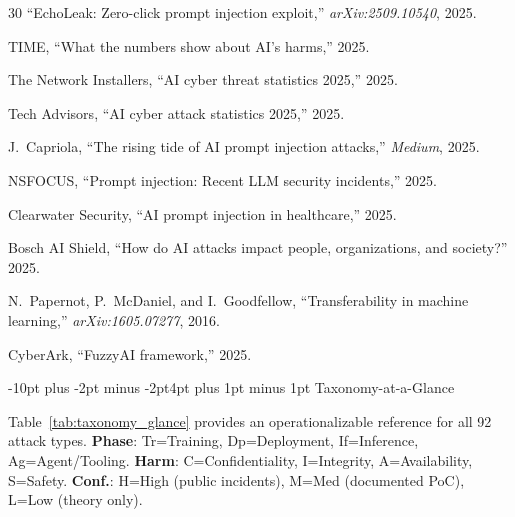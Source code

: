 \documentclass[conference]{IEEEtran}
\makeatletter
\renewcommand{\section}{\@startsection{section}{1}{\z@}%
  {-10pt plus -2pt minus -2pt}{4pt plus 1pt minus 1pt}%
  {\normalfont\large\bfseries\sffamily\color{accentdark}}}
\makeatother
\begin{document}
\begin{thebibliography}{30}
``EchoLeak: Zero-click prompt injection exploit,'' \emph{arXiv:2509.10540}, 2025.

TIME, ``What the numbers show about AI's harms,'' 2025.

The Network Installers, ``AI cyber threat statistics 2025,'' 2025.

Tech Advisors, ``AI cyber attack statistics 2025,'' 2025.

J.~Capriola, ``The rising tide of AI prompt injection attacks,'' \emph{Medium}, 2025.

NSFOCUS, ``Prompt injection: Recent LLM security incidents,'' 2025.

Clearwater Security, ``AI prompt injection in healthcare,'' 2025.

Bosch AI Shield, ``How do AI attacks impact people, organizations, and society?'' 2025.

N.~Papernot, P.~McDaniel, and I.~Goodfellow, ``Transferability in machine learning,'' \emph{arXiv:1605.07277}, 2016.

CyberArk, ``FuzzyAI framework,'' 2025.

\end{thebibliography}


\appendix


\onecolumn
\section{Taxonomy-at-a-Glance}\label{app:taxonomy}

Table~\ref{tab:taxonomy_glance} provides an operationalizable reference for all 92 attack types. \textbf{Phase}: Tr=Training, Dp=Deployment, If=Inference, Ag=Agent/Tooling. \textbf{Harm}: C=Confidentiality, I=Integrity, A=Availability, S=Safety. \textbf{Conf.}: H=High (public incidents), M=Med (documented PoC), L=Low (theory only).
\end{document}
